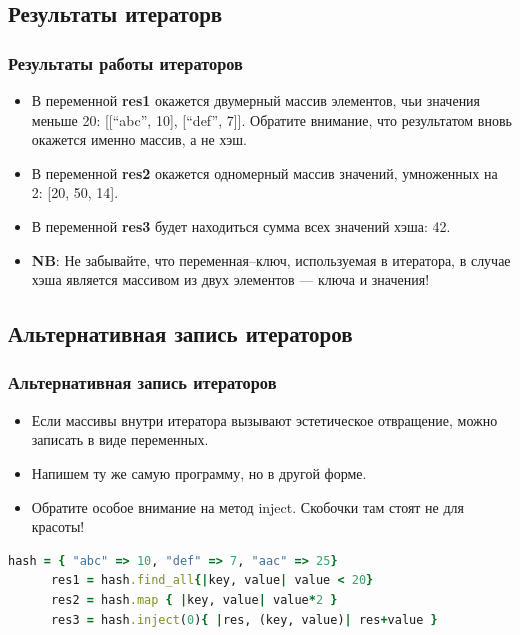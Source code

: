 \documentclass[compress,red]{beamer}
\begin{document}
\subsection{Результаты итераторв}
\begin{frame}
  \frametitle{Результаты работы итераторов}
  \begin{itemize}
    \item В переменной \textbf{res1} окажется двумерный массив элементов, чьи значения меньше 20: [[``abc'', 10], [``def'', 7]]. Обратите внимание, что результатом вновь окажется именно массив, а не хэш.
    \item В переменной \textbf{res2} окажется одномерный массив значений, умноженных на 2: [20, 50, 14].
    \item В переменной \textbf{res3} будет находиться сумма всех значений хэша: 42.
    \item \textbf{NB}: Не забывайте, что переменная--ключ, используемая в итератора, в случае хэша является массивом из двух элементов --- ключа и значения!
  \end{itemize}
\end{frame}

\subsection{Альтернативная запись итераторов}
\begin{frame}[fragile]
  \frametitle{Альтернативная запись итераторов}

  \begin{itemize}
    \item Если массивы внутри итератора вызывают эстетическое отвращение, можно записать в виде переменных.
    \item Напишем ту же самую программу, но в другой форме.
    \item Обратите особое внимание на метод inject. Скобочки там стоят не для красоты!
  \end{itemize}

  \scriptsize{
    \begin{lstlisting}[language=ruby,basicstyle=\footnotesize,label=ruby9,caption=Альтернативная запись]
      hash = { "abc" => 10, "def" => 7, "aac" => 25}
      res1 = hash.find_all{|key, value| value < 20} 
      res2 = hash.map { |key, value| value*2 }
      res3 = hash.inject(0){ |res, (key, value)| res+value }
    \end{lstlisting}
  }

\end{frame}
\end{document}
